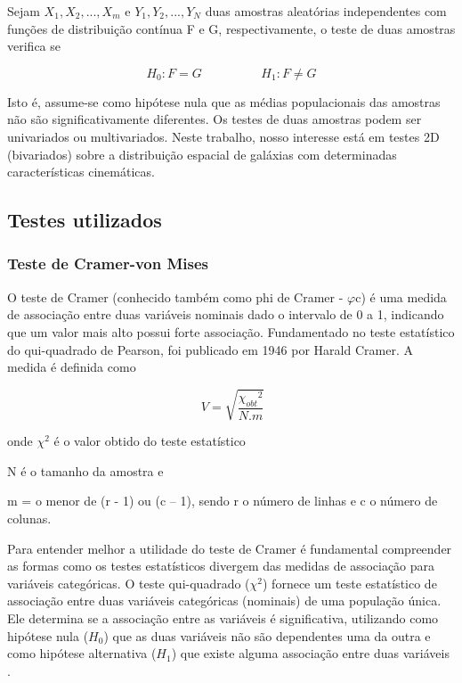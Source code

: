 Sejam $X_1, X_2, ..., X_m$ e $Y_1, Y_2, ..., Y_N$ duas amostras aleatórias independentes com funções de distribuição contínua F e G, respectivamente, o teste de duas amostras verifica se

\begin{equation}
 H_0 : F = G  \hspace{2cm} H_1 : F \neq G
\label{eq:twoSample}
\end{equation}

Isto é, assume-se como hipótese nula que as médias populacionais das amostras não são significativamente diferentes.
Os testes de duas amostras podem ser univariados ou multivariados. Neste trabalho, nosso interesse 
está em testes 2D (bivariados) sobre a distribuição espacial de galáxias com determinadas características cinemáticas.

\subsection{Testes utilizados}
\subsubsection{Teste de Cramer-von Mises}
O teste de Cramer (conhecido também como phi de Cramer - $\varphi$c) é uma medida de associação entre duas variáveis nominais dado o intervalo de 0 a 1, indicando que um valor mais alto possui forte associação. Fundamentado no teste estatístico do qui-quadrado de Pearson, foi publicado em 1946 por Harald Cramer. A medida é definida como

\begin{equation}
\ V = \sqrt{\frac{{\chi_{obt}}^2}{N.m}}
\label{eq:eq1}
\end{equation}
	
	onde $\chi^2$ é o valor obtido do teste estatístico
	
	N é o tamanho da amostra e 
    
    m = o menor de (r - 1) ou (c – 1), sendo r o número de linhas e c o número de colunas.

Para entender melhor a utilidade do teste de Cramer é fundamental compreender as formas como os testes estatísticos divergem das medidas de associação para variáveis categóricas. O teste qui-quadrado ($\chi^2$) fornece um teste estatístico de associação entre duas variáveis categóricas (nominais) de uma população única. Ele determina se a associação entre as variáveis é significativa, utilizando como hipótese nula ($H_0$) que as duas variáveis não são dependentes uma da outra e como hipótese alternativa ($H_1$) que existe alguma associação entre duas variáveis \cite{bachman2017statistics}.

